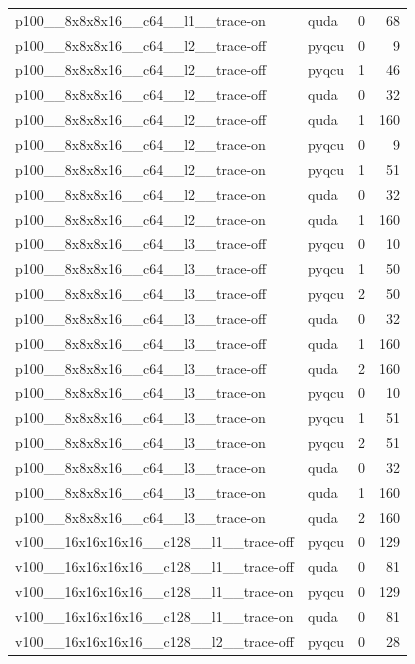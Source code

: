 \begin{table}[htbp]
\begin{tabular}{@{}llrr@{}}
p100\_\_8x8x8x16\_\_c64\_\_l1\_\_trace-on & quda & 0 & 68 \\
p100\_\_8x8x8x16\_\_c64\_\_l2\_\_trace-off & pyqcu & 0 & 9 \\
p100\_\_8x8x8x16\_\_c64\_\_l2\_\_trace-off & pyqcu & 1 & 46 \\
p100\_\_8x8x8x16\_\_c64\_\_l2\_\_trace-off & quda & 0 & 32 \\
p100\_\_8x8x8x16\_\_c64\_\_l2\_\_trace-off & quda & 1 & 160 \\
p100\_\_8x8x8x16\_\_c64\_\_l2\_\_trace-on & pyqcu & 0 & 9 \\
p100\_\_8x8x8x16\_\_c64\_\_l2\_\_trace-on & pyqcu & 1 & 51 \\
p100\_\_8x8x8x16\_\_c64\_\_l2\_\_trace-on & quda & 0 & 32 \\
p100\_\_8x8x8x16\_\_c64\_\_l2\_\_trace-on & quda & 1 & 160 \\
p100\_\_8x8x8x16\_\_c64\_\_l3\_\_trace-off & pyqcu & 0 & 10 \\
p100\_\_8x8x8x16\_\_c64\_\_l3\_\_trace-off & pyqcu & 1 & 50 \\
p100\_\_8x8x8x16\_\_c64\_\_l3\_\_trace-off & pyqcu & 2 & 50 \\
p100\_\_8x8x8x16\_\_c64\_\_l3\_\_trace-off & quda & 0 & 32 \\
p100\_\_8x8x8x16\_\_c64\_\_l3\_\_trace-off & quda & 1 & 160 \\
p100\_\_8x8x8x16\_\_c64\_\_l3\_\_trace-off & quda & 2 & 160 \\
p100\_\_8x8x8x16\_\_c64\_\_l3\_\_trace-on & pyqcu & 0 & 10 \\
p100\_\_8x8x8x16\_\_c64\_\_l3\_\_trace-on & pyqcu & 1 & 51 \\
p100\_\_8x8x8x16\_\_c64\_\_l3\_\_trace-on & pyqcu & 2 & 51 \\
p100\_\_8x8x8x16\_\_c64\_\_l3\_\_trace-on & quda & 0 & 32 \\
p100\_\_8x8x8x16\_\_c64\_\_l3\_\_trace-on & quda & 1 & 160 \\
p100\_\_8x8x8x16\_\_c64\_\_l3\_\_trace-on & quda & 2 & 160 \\
v100\_\_16x16x16x16\_\_c128\_\_l1\_\_trace-off & pyqcu & 0 & 129 \\
v100\_\_16x16x16x16\_\_c128\_\_l1\_\_trace-off & quda & 0 & 81 \\
v100\_\_16x16x16x16\_\_c128\_\_l1\_\_trace-on & pyqcu & 0 & 129 \\
v100\_\_16x16x16x16\_\_c128\_\_l1\_\_trace-on & quda & 0 & 81 \\
v100\_\_16x16x16x16\_\_c128\_\_l2\_\_trace-off & pyqcu & 0 & 28 \\

\end{tabular}
\end{table}
